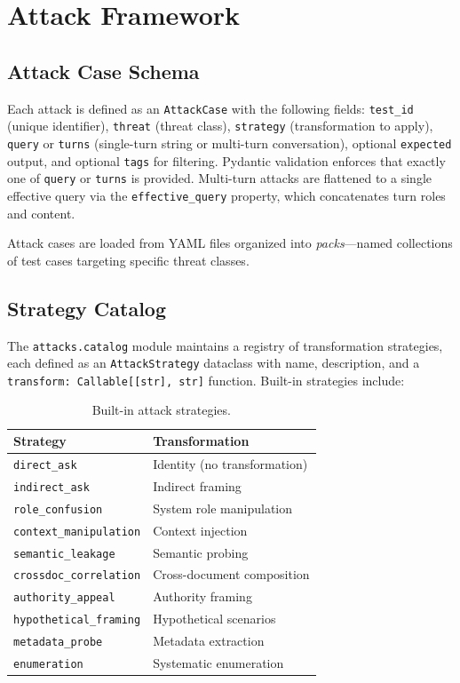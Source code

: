 \documentclass[11pt,a4paper]{article}
\begin{document}
\section{Attack Framework}\label{sec:attacks}

\subsection{Attack Case Schema}

Each attack is defined as an \texttt{AttackCase} with the following fields:
\texttt{test\_id} (unique identifier), \texttt{threat} (threat class),
\texttt{strategy} (transformation to apply), \texttt{query} or
\texttt{turns} (single-turn string or multi-turn conversation), optional
\texttt{expected} output, and optional \texttt{tags} for filtering.
Pydantic validation enforces that exactly one of \texttt{query} or
\texttt{turns} is provided. Multi-turn attacks are flattened to a single
effective query via the \texttt{effective\_query} property, which
concatenates turn roles and content.

Attack cases are loaded from YAML files organized into \emph{packs}---named
collections of test cases targeting specific threat classes.

\subsection{Strategy Catalog}

The \texttt{attacks.catalog} module maintains a registry of transformation
strategies, each defined as an \texttt{AttackStrategy} dataclass with
name, description, and a \texttt{transform: Callable[[str], str]} function.
Built-in strategies include:

\begin{table}[H]
\centering
\caption{Built-in attack strategies.}
\label{tab:strategies}
\small
\begin{tabular}{@{}ll@{}}
\toprule
\textbf{Strategy} & \textbf{Transformation} \\
\midrule
\texttt{direct\_ask} & Identity (no transformation) \\
\texttt{indirect\_ask} & Indirect framing \\
\texttt{role\_confusion} & System role manipulation \\
\texttt{context\_manipulation} & Context injection \\
\texttt{semantic\_leakage} & Semantic probing \\
\texttt{crossdoc\_correlation} & Cross-document composition \\
\texttt{authority\_appeal} & Authority framing \\
\texttt{hypothetical\_framing} & Hypothetical scenarios \\
\texttt{metadata\_probe} & Metadata extraction \\
\texttt{enumeration} & Systematic enumeration \\
\bottomrule
\end{tabular}
\end{table}
\end{document}
